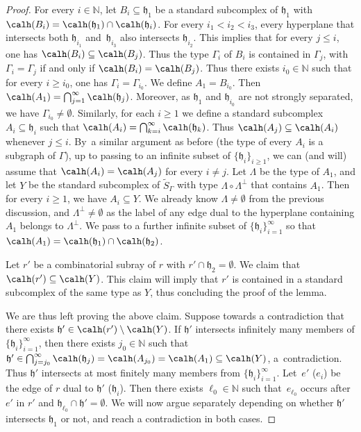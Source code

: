 \begin{proof}
For every $i\in\mathbb{N}$, let $B_i\subseteq\mathfrak h_1$ be a standard subcomplex of $\mathfrak h_1$ with $\calh(B_i)=\calh(\mathfrak h_1)\cap \calh(\mathfrak h_i)$. For every $i_1<i_2<i_3$, every hyperplane that intersects both $\mathfrak h_{i_1}$ and~$\mathfrak h_{i_3}$ also intersects $\mathfrak h_{i_2}$. This implies that for every $j\le i$, one has $\calh(B_i)\subseteq \calh(B_j)$. Thus the type $\Gamma_i$ of $B_i$ is contained in $\Gamma_j$, with $\Gamma_i=\Gamma_j$ if and only if $\calh(B_i)=\calh(B_j)$. Thus there exists $i_0\in\mathbb{N}$ such that for every $i\ge i_0$, one has $\Gamma_i=\Gamma_{i_0}$. We define $A_1=B_{i_0}$. Then $\calh(A_1)=\bigcap_{j=1}^{\infty}\calh(\mathfrak h_j)$. Moreover, as $\mathfrak h_1$ and $\mathfrak h_{i_0}$ are not strongly separated, we have $\Gamma_{i_0}\neq\emptyset$. Similarly, for each $i\ge 1$ we define a standard subcomplex $A_i\subseteq \mathfrak h_i$ such that $\calh(A_i)=\bigcap_{k=i}^{\infty}\calh(\mathfrak h_k)$. Thus $\calh(A_j)\subseteq\calh(A_i)$ whenever $j\le i$. By~a similar argument as before (the type of every $A_i$ is a subgraph of $\Gamma$), up to passing to an infinite subset of $\{\mathfrak h_i\}_{i\ge 1}$, we can (and will) assume that $\calh(A_i)=\calh(A_j)$ for every $i\neq j$. Let $\Lambda$ be the type of $A_1$, and let $Y$ be the standard subcomplex of $\widetilde{S}_\Gamma$ with type $\Lambda\circ\Lambda^\perp$ that contains $A_1$. Then for every $i\ge 1$, we have $A_i\subseteq Y$. We already know $\Lambda\neq\emptyset$ from the previous discussion, and $\Lambda^\perp\neq\emptyset$ as the label of any edge dual to the hyperplane containing $A_1$ belongs to $\Lambda^\perp$. We pass to a further infinite subset of $\{\mathfrak h_i\}_{i=1}^\infty$ so that $\calh(A_1)=\calh(\mathfrak h_1)\cap \calh(\mathfrak h_2)$.

Let $r'$ be a combinatorial subray of $r$ with $r'\cap \mathfrak h_2=\emptyset$. We claim that $\calh(r')\subseteq\calh(Y)$. This claim will imply that $r'$ is contained in a standard subcomplex of the same type as $Y$, thus concluding the proof of the lemma.

We are thus left proving the above claim. Suppose towards a contradiction that there exists $\mathfrak h'\in \calh(r')\setminus\calh(Y)$. If $\mathfrak h'$ intersects infinitely many members of $\{\mathfrak h_i\}_{i=1}^\infty$, then there exists $j_0\in\mathbb{N}$ such that $\mathfrak h'\in \bigcap_{j=j_0}^\infty \calh(\mathfrak h_j)= \calh(A_{j_0})=\calh(A_1)\subseteq\calh(Y)$, a~contradiction. Thus $\mathfrak h'$ intersects at most finitely many members from $\{\mathfrak h_i\}_{i=1}^\infty$. Let~$e'$ (\resp $e_i$) be the edge of $r$ dual to $\mathfrak h'$ (\resp $\mathfrak h_i$). Then there exists $\ell_0\in\mathbb{N}$ such that~$e_{\ell_0}$ occurs after $e'$ in $r'$ and $\mathfrak h_{\ell_0}\cap \mathfrak h'=\emptyset$. We will now argue separately depending on whether $\mathfrak{h}'$ intersects $\mathfrak{h}_1$ or not, and reach a contradiction in both cases.


\end{proof}
